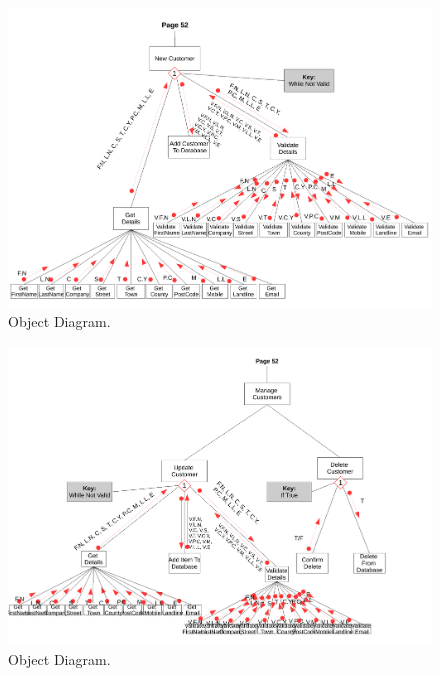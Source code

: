 \begin{landscape}
\newpage

\begin{figure}[H]
    \begin{center}
    \includegraphics[width=500px]{./Design/top_down_design/new_customer.pdf}
    \caption{Object Diagram.} \label{fig:object_diagram}
    \end{center}
\end{figure}

\newpage

\begin{figure}[H]
    \begin{center}
    \includegraphics[width=500px]{./Design/top_down_design/manage_customers.pdf}
    \caption{Object Diagram.} \label{fig:object_diagram}
    \end{center}
\end{figure}


\end{landscape}
